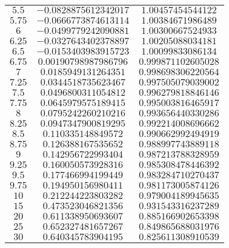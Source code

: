 {\begin{tabular}{|*{3}{c}|}
$              5.5$ & $-0.0828875612342017$ & $ 1.00457454544122$ \\
$             5.75$ & $-0.0666773874613114$ & $ 1.00384671986489$ \\
$                6$ & $-0.0499779242090881$ & $ 1.00300667524933$ \\
$             6.25$ & $-0.0327643402378897$ & $ 1.00205088034181$ \\
$              6.5$ & $-0.0153403983915723$ & $ 1.00099833086134$ \\
$             6.75$ & $0.00190798987986796$ & $0.999871102605028$ \\
$                7$ & $0.0185949131264351$ & $0.998698306220564$ \\
$             7.25$ & $0.0344518735623467$ & $0.997505079039002$ \\
$              7.5$ & $0.0496800311054812$ & $0.996279818846146$ \\
$             7.75$ & $0.0645979575189415$ & $0.995003816465917$ \\
$                8$ & $0.0795242260210216$ & $0.993656440330286$ \\
$             8.25$ & $0.0947347900819295$ & $0.992214008696662$ \\
$              8.5$ & $0.110335148849572$ & $0.990662992494919$ \\
$             8.75$ & $0.126388167535652$ & $0.988997743889118$ \\
$                9$ & $0.142956722993404$ & $0.987213788328959$ \\
$             9.25$ & $0.160050573928316$ & $0.985308478446392$ \\
$              9.5$ & $0.177466994199449$ & $0.983284710270437$ \\
$             9.75$ & $0.194950156980411$ & $0.981173005874126$ \\
$               10$ & $0.212244223803282$ & $0.979004189945635$ \\
$               15$ & $0.473523046821356$ & $0.931543316237289$ \\
$               20$ & $0.611338950693607$ & $0.885166902653398$ \\
$               25$ & $0.652327481657267$ & $0.849865688031976$ \\
$               30$ & $0.640345783904195$ & $0.825611308910539$ \\\hline
\end{tabular}
}

